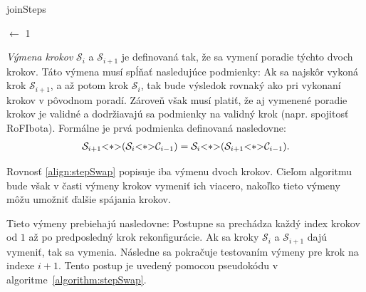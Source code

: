 \documentclass[
  digital, %
  oneside, %
  notable,   %
  lof,     %
  nolot,     %
]{fithesis3}
\begin{document}
\begin{algorithm}
    \caption{joinSteps}
    \label{algorithm:stepJoin}
    \DontPrintSemicolon
    
    \CurrIndex $\leftarrow$ 1\;
\end{algorithm}

\textit{Výmena krokov} $\mathcal{S}_i$ a $\mathcal{S}_{i + 1}$ je definovaná tak, že sa vymení poradie týchto dvoch krokov. Táto výmena musí spĺňať nasledujúce podmienky: Ak sa najskôr vykoná krok $\mathcal{S}_{i + 1}$, a až potom krok $\mathcal{S}_i$, tak bude výsledok rovnaký ako pri vykonaní krokov v pôvodnom poradí. Zároveň však musí platiť, že aj vymenené poradie krokov je validné a dodržiavajú sa podmienky na validný krok (napr. spojitosť RoFIbota). Formálne je prvá podmienka definovaná nasledovne: 
\begin{align}
\label{align:stepSwap}
\mathcal{S}_{i + 1} \lstinline{<*>} (\mathcal{S}_i \lstinline{<*>} \mathcal{C}_{i - 1}) = \mathcal{S}_i \lstinline{<*>} (\mathcal{S}_{i + 1} \lstinline{<*>} \mathcal{C}_{i - 1}). 
\end{align}

Rovnosť \ref{align:stepSwap} popisuje iba výmenu dvoch krokov. Cieľom algoritmu bude však v časti výmeny krokov vymeniť ich viacero, nakoľko tieto výmeny môžu umožniť ďalšie spájania krokov. 

Tieto výmeny prebiehajú nasledovne: Postupne sa prechádza každý index krokov od $1$ až po predposledný krok rekonfigurácie. Ak sa kroky $\mathcal{S}_i$ a $\mathcal{S}_{i + 1}$ dajú vymeniť, tak sa vymenia. Následne sa pokračuje testovaním výmeny pre krok na indexe $i + 1$. Tento postup je uvedený pomocou pseudokódu v algoritme~\ref{algorithm:stepSwap}. 
\end{document}
